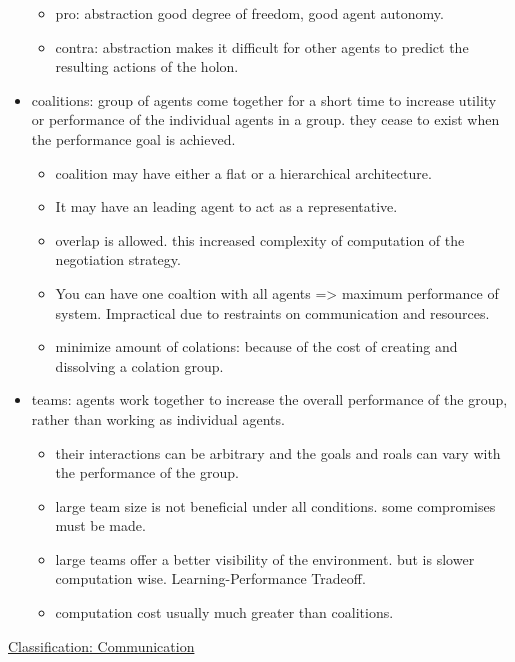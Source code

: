 \begin{itemize}[noitemsep,nolistsep]
\begin{itemize}[noitemsep,nolistsep]
		\item pro: abstraction good degree of freedom, good agent autonomy.
		\item contra: abstraction makes it difficult for other agents to predict the resulting actions of the holon.
	\end{itemize}
	\item coalitions: group of agents come together for a short time to increase utility or performance of the individual agents in a group. they cease to exist when the performance goal is achieved.
	\begin{itemize}[noitemsep,nolistsep]
		\item coalition may have either a flat or a hierarchical architecture.
		\item It may have an leading agent to act as a representative. 
		\item overlap is allowed. this increased complexity of computation of the negotiation strategy.
		\item You can have one coaltion with all agents => maximum performance of system. Impractical due to restraints on communication and resources.
		\item minimize amount of colations: because of the cost of creating and dissolving a colation group.
	\end{itemize}
	\item teams: agents work together to increase the overall performance of the group, rather than working as individual agents.
	\begin{itemize}[noitemsep,nolistsep]
		\item their interactions can be arbitrary and the goals and roals can vary with the performance of the group.
		\item large team size is not beneficial under all conditions. some compromises must be made.
		\item large teams offer a better visibility of the environment. but is slower computation wise. Learning-Performance Tradeoff.
		\item computation cost usually much greater than coalitions.
	\end{itemize}
\end{itemize}
\underline{Classification: Communication}
